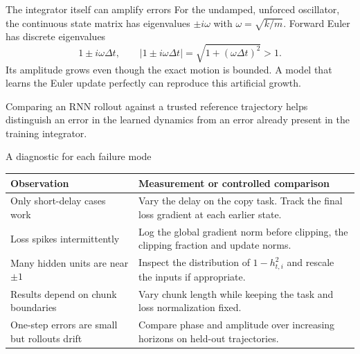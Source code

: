 \documentclass[aspectratio=169,11pt]{beamer}
\begin{document}
\begin{frame}{The integrator itself can amplify errors}
For the undamped, unforced oscillator, the continuous state matrix has
eigenvalues $\pm i\omega$ with $\omega=\sqrt{k/m}$. Forward Euler has
discrete eigenvalues
\[
1\pm i\omega\Delta t,\qquad |1\pm i\omega\Delta t|
=\sqrt{1+(\omega\Delta t)^2}>1.
\]
Its amplitude grows even though the exact motion is bounded. A model that
learns the Euler update perfectly can reproduce this artificial growth.
\par
Comparing an RNN rollout against a trusted reference trajectory helps
distinguish an error in the learned dynamics from an error already present
in the training integrator.
\end{frame}
\begin{frame}{A diagnostic for each failure mode}
\small
\begin{center}\begin{tabular}{p{4.4cm}p{8.1cm}}\toprule
Observation & Measurement or controlled comparison\\\midrule
Only short-delay cases work & Vary the delay on the copy task. Track the final loss gradient at each earlier state.\\[3pt]
Loss spikes intermittently & Log the global gradient norm before clipping, the clipping fraction and update norms.\\[3pt]
Many hidden units are near $\pm1$ & Inspect the distribution of $1-h_{t,i}^2$ and rescale the inputs if appropriate.\\[3pt]
Results depend on chunk boundaries & Vary chunk length while keeping the task and loss normalization fixed.\\[3pt]
One-step errors are small but rollouts drift & Compare phase and amplitude over increasing horizons on held-out trajectories.\\\bottomrule
\end{tabular}\end{center}
\end{frame}
\end{document}
